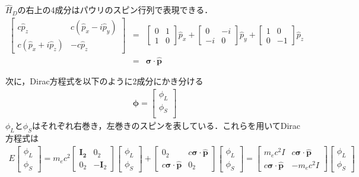 \documentclass[10pt]{ujarticle}
\begin{document}
$\hat{H}_D$の右上の4成分はパウリのスピン行列で表現できる．
\begin{eqnarray}
\left[
\begin{array}{cc}
  c \hat{p}_z & c(\hat{p}_x-i\hat{p}_y) \\
  c(\hat{p}_x+i\hat{p}_z) & -c \hat{p}_z 
\end{array}
\right]
&=&
\left[
\begin{array}{cc}
  0 & 1 \\
  1 & 0
\end{array}
\right]
\hat{p}_x
+
\left[
\begin{array}{cc}
  0 & -i \\
  -i & 0
\end{array}
\right]
\hat{p}_y
+
\left[
\begin{array}{cc}
  1 & 0 \\
  0 & -1
\end{array}
\right]
\hat{p}_z \\
&=&
\bm{\sigma} \cdot \bm{\hat{p}}
\end{eqnarray}

次に，Dirac方程式を以下のように2成分にかき分ける
\begin{eqnarray}
\bm{\phi}=
\left[
\begin{array}{c}
  \phi_L \\
  \phi_S \\
\end{array}
\right]
\end{eqnarray}
$\phi_L$と$\phi_S$はそれぞれ右巻き，左巻きのスピンを表している．これらを用いてDirac方程式は
\begin{eqnarray}
E
\left[
\begin{array}{c}
  \phi_L \\
  \phi_S 
\end{array}
\right]
=
m_e c^2
\left[
\begin{array}{cc}
  \bm{I_2} & 0_2 \\
  0_2 & -\bm{I}_2
\end{array}
\right]
\left[
\begin{array}{c}
  \phi_L \\
  \phi_S 
\end{array}
\right]
+
\left[
\begin{array}{cc}
  0_2 & c \bm{\sigma}\cdot \bm{\hat{p}} \\
  c \bm{\sigma}\cdot \bm{\hat{p}} & 0_2
\end{array}
\right]
\left[
\begin{array}{c}
  \phi_L \\
  \phi_S 
\end{array}
\right]
=
\left[
\begin{array}{cc}
  m_e c^2 I & c \bm{\sigma}\cdot \bm{\hat{p}} \\
  c \bm{\sigma}\cdot \bm{\hat{p}} & -m_e c^2 I
\end{array}
\right]
\left[
\begin{array}{c}
  \phi_L \\
  \phi_S 
\end{array}
\right]
\end{eqnarray}
\end{document}
